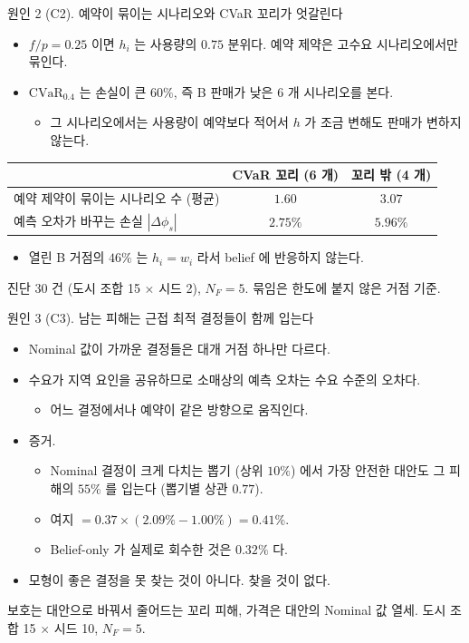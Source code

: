 \documentclass[aspectratio=169,11pt]{beamer}
\newcommand{\CVaR}{\mathrm{CVaR}}
\begin{document}
\begin{frame}{원인 2 (C2). 예약이 묶이는 시나리오와 CVaR 꼬리가 엇갈린다}
\begin{itemize}
  \item $f/p = 0.25$ 이면 $h_i$ 는 사용량의 $0.75$ 분위다. 예약 제약은 고수요 시나리오에서만 묶인다.
  \item $\CVaR_{0.4}$ 는 손실이 큰 $60\%$, 즉 B 판매가 낮은 6 개 시나리오를 본다.
  \begin{itemize}
    \item 그 시나리오에서는 사용량이 예약보다 적어서 $h$ 가 조금 변해도 판매가 변하지 않는다.
  \end{itemize}
\end{itemize}
\begin{center}
\small
\begin{tabular}{lcc}
\toprule
 & CVaR 꼬리 (6 개) & 꼬리 밖 (4 개)\\
\midrule
예약 제약이 묶이는 시나리오 수 (평균) & $1.60$ & $3.07$\\
예측 오차가 바꾸는 손실 $|\Delta\phi_s|$ & $2.75\%$ & $5.96\%$\\
\bottomrule
\end{tabular}
\end{center}
\begin{itemize}
  \item 열린 B 거점의 $46\%$ 는 $h_i = w_i$ 라서 belief 에 반응하지 않는다.
\end{itemize}
\vfill
{\footnotesize 진단 30 건 (도시 조합 15 $\times$ 시드 2), $N_F = 5$. 묶임은 한도에 붙지 않은 거점 기준.}
\end{frame}

\begin{frame}{원인 3 (C3). 남는 피해는 근접 최적 결정들이 함께 입는다}
\begin{itemize}
  \item Nominal 값이 가까운 결정들은 대개 거점 하나만 다르다.
  \item 수요가 지역 요인을 공유하므로 소매상의 예측 오차는 수요 수준의 오차다.
  \begin{itemize}
    \item 어느 결정에서나 예약이 같은 방향으로 움직인다.
  \end{itemize}
  \item 증거.
  \begin{itemize}
    \item Nominal 결정이 크게 다치는 뽑기 (상위 $10\%$) 에서 가장 안전한 대안도 그 피해의 $55\%$ 를 입는다 (뽑기별 상관 $0.77$).
    \item 여지 $= 0.37 \times (2.09\% - 1.00\%) = 0.41\%$.
    \item Belief-only 가 실제로 회수한 것은 $0.32\%$ 다.
  \end{itemize}
  \item 모형이 좋은 결정을 못 찾는 것이 아니다. 찾을 것이 없다.
\end{itemize}
\vfill
{\footnotesize 보호는 대안으로 바꿔서 줄어드는 꼬리 피해, 가격은 대안의 Nominal 값 열세. 도시 조합 15 $\times$ 시드 10, $N_F = 5$.}
\end{frame}
\end{document}
